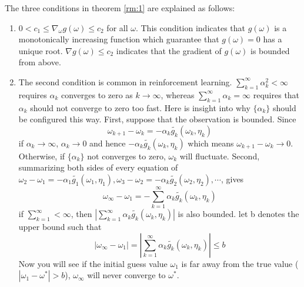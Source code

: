   The three conditions  in theorem \ref{rm:1} are explained as
  follows:
  \begin{enumerate}
    \item
          $0<c_{1} \le \nabla_{\omega}g(\omega) \le c_{2}$ for all $\omega$. This condition indicates that $g(\omega)$ is a
          monotonically increasing function which guarantee that $g(\omega)=0$ has a unique root. $\nabla g(\omega) \le c_{2}$
          indicates that the gradient of $g(\omega)$ is bounded from above.
    \item
          The second condition is common in reinforcement learning. $\sum_{k=1}^{\infty}\alpha_{k}^{2} < \infty$ requires
          $\alpha_{k}$ converges to zero as $k \to \infty$, whereas $\sum_{k=1}^{\infty}\alpha_{k}=\infty$ requires that
          $\alpha_{k}$ should not converge to zero too fast. Here is insight into why $\{\alpha_{k}\}$ should be configured this
          way. First, suppose that the observation is bounded. Since
          \begin{equation*}
            \omega_{k+1} - \omega_{k} = -\alpha_{k}\tilde{g_{k}}(\omega_{k},\eta_{k})
          \end{equation*}
          if $\alpha_{k}\to \infty$, $\alpha_{k}\to 0$ and hence $-\alpha_{k}\tilde{g_{k}}(\omega_{k},\eta_{k})$ which means
          $\omega_{k+1}-\omega_{k} \to 0$. Otherwise, if $\{\alpha_{k}\}$ not converges to zero, $\omega_{k}$ will fluctuate.
          Second, summarizing both sides of every equation of $\omega_{2} - \omega_{1} =
            -\alpha_{1}\tilde{g_{1}}(\omega_{1},\eta_{1}), \omega_{3} - \omega_{2} =
            -\alpha_{k}\tilde{g_{2}}(\omega_{2},\eta_{2}), \cdots$, gives
          \begin{equation*}
            \omega_{\infty} - \omega_{1} = -\sum_{k=1}^{\infty}\alpha_{k}\tilde{g_{k}}(\omega_{k},\eta_{k})
          \end{equation*}
          if $\sum_{k=1}^{\infty}<\infty$, then $\left|\sum_{k=1}^{\infty}\alpha_{k}\tilde{g_{k}}(\omega_{k},\eta_{k})\right|$
          is also bounded. let b denotes the upper bound such that
          \begin{equation*}
            \left|\omega_{\infty} - \omega_{1}\right| =
            \left|\sum_{k=1}^{\infty}\alpha_{k}\tilde{g_{k}}(\omega_{k},\eta_{k})\right| \le b
          \end{equation*}
          Now you will see if the initial guess value $\omega_{1}$ is far away from the true value
          ($\left|\omega_{1}-\omega^{*}\right|>b$), $\omega_{\infty}$ will never converge to $\omega^{*}$.
  \end{enumerate}

